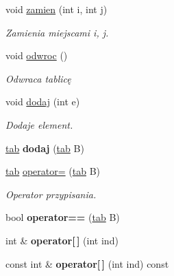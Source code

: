 \begin{DoxyCompactItemize}
\item 
\hypertarget{classtab_a10e82358be59b7d217a0eb407609c4c3}{void \hyperlink{classtab_a10e82358be59b7d217a0eb407609c4c3}{zamien} (int i, int j)}\label{classtab_a10e82358be59b7d217a0eb407609c4c3}

\begin{DoxyCompactList}\small\item\em \-Zamienia miejscami i, j. \end{DoxyCompactList}\item 
\hypertarget{classtab_a3892398e71e9d23417c8dce1b1ba852f}{void \hyperlink{classtab_a3892398e71e9d23417c8dce1b1ba852f}{odwroc} ()}\label{classtab_a3892398e71e9d23417c8dce1b1ba852f}

\begin{DoxyCompactList}\small\item\em \-Odwraca tablicę \end{DoxyCompactList}\item 
\hypertarget{classtab_ac828a8cc3a4a8dee8b64087c84dc0324}{void \hyperlink{classtab_ac828a8cc3a4a8dee8b64087c84dc0324}{dodaj} (int e)}\label{classtab_ac828a8cc3a4a8dee8b64087c84dc0324}

\begin{DoxyCompactList}\small\item\em \-Dodaje element. \end{DoxyCompactList}\item 
\hypertarget{classtab_ab0a19b1dae911cb14ff2dfa4a68cd7a1}{\hyperlink{classtab}{tab} {\bfseries dodaj} (\hyperlink{classtab}{tab} \-B)}\label{classtab_ab0a19b1dae911cb14ff2dfa4a68cd7a1}

\item 
\hypertarget{classtab_af186c24050e089bb140bc2980bab8448}{\hyperlink{classtab}{tab} \hyperlink{classtab_af186c24050e089bb140bc2980bab8448}{operator=} (\hyperlink{classtab}{tab} \-B)}\label{classtab_af186c24050e089bb140bc2980bab8448}

\begin{DoxyCompactList}\small\item\em \-Operator przypisania. \end{DoxyCompactList}\item 
\hypertarget{classtab_a2729682ece1734772085a32ab2a992e5}{bool {\bfseries operator==} (\hyperlink{classtab}{tab} \-B)}\label{classtab_a2729682ece1734772085a32ab2a992e5}

\item 
\hypertarget{classtab_a23e94e4776514df4df47329b108a45f4}{int \& {\bfseries operator\mbox{[}$\,$\mbox{]}} (int ind)}\label{classtab_a23e94e4776514df4df47329b108a45f4}

\item 
\hypertarget{classtab_a2fa52b51fba4635cf0e0fcf310d8c143}{const int \& {\bfseries operator\mbox{[}$\,$\mbox{]}} (int ind) const }\label{classtab_a2fa52b51fba4635cf0e0fcf310d8c143}

\end{DoxyCompactItemize}


